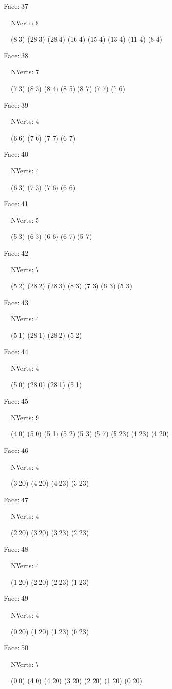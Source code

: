 \documentclass{article}
\begin{document}
{\footnotesize 

Face: 37

\   \    NVerts: 8

 \   \   (8 3) (28 3) (28 4) (16 4) (15 4) (13 4) (11 4) (8 4)}

{\footnotesize 

Face: 38

\   \    NVerts: 7

 \   \   (7 3) (8 3) (8 4) (8 5) (8 7) (7 7) (7 6)}

{\footnotesize 

Face: 39

\   \    NVerts: 4

 \   \   (6 6) (7 6) (7 7) (6 7)}

{\footnotesize 

Face: 40

\   \    NVerts: 4

 \   \   (6 3) (7 3) (7 6) (6 6)}

{\footnotesize 

Face: 41

\   \    NVerts: 5

 \   \   (5 3) (6 3) (6 6) (6 7) (5 7)}

{\footnotesize 

Face: 42

\   \    NVerts: 7

 \   \   (5 2) (28 2) (28 3) (8 3) (7 3) (6 3) (5 3)}

{\footnotesize 

Face: 43

\   \    NVerts: 4

 \   \   (5 1) (28 1) (28 2) (5 2)}

{\footnotesize 

Face: 44

\   \    NVerts: 4

 \   \   (5 0) (28 0) (28 1) (5 1)}

{\footnotesize 

Face: 45

\   \    NVerts: 9

 \   \   (4 0) (5 0) (5 1) (5 2) (5 3) (5 7) (5 23) (4 23) (4 20)}

{\footnotesize 

Face: 46

\   \    NVerts: 4

 \   \   (3 20) (4 20) (4 23) (3 23)}

{\footnotesize 

Face: 47

\   \    NVerts: 4

 \   \   (2 20) (3 20) (3 23) (2 23)}

{\footnotesize 

Face: 48

\   \    NVerts: 4

 \   \   (1 20) (2 20) (2 23) (1 23)}

{\footnotesize 

Face: 49

\   \    NVerts: 4

 \   \   (0 20) (1 20) (1 23) (0 23)}

{\footnotesize 

Face: 50

\   \    NVerts: 7

 \   \   (0 0) (4 0) (4 20) (3 20) (2 20) (1 20) (0 20)}


 \newpage
\end{document}
